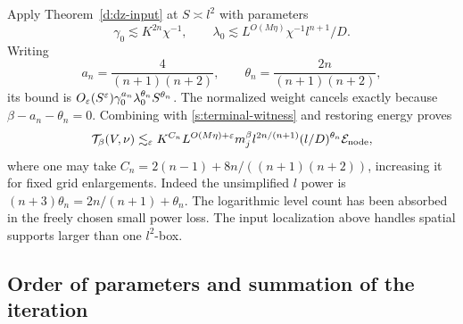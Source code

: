 Apply Theorem~\ref{d:dz-input} at $S\asymp l^2$ with parameters
\[
 \gamma_0\lesssim K^{2n}\chi^{-1},\qquad
 \lambda_0\lesssim L^{O(M\eta)}\chi^{-1}l^{n+1}/D.
\]
Writing
\[
 a_n=\frac4{(n+1)(n+2)},\qquad
 \theta_n=\frac{2n}{(n+1)(n+2)},
\]
its bound is $O_\varepsilon(S^\varepsilon)\gamma_0^{a_n}\lambda_0^{\theta_n}
S^{\theta_n}$.  The normalized weight cancels exactly because
$\beta-a_n-\theta_n=0$.  Combining with \eqref{s:terminal-witness}
and restoring energy proves
\begin{equation}\label{s:terminal-bound}
 \mathcal T_\beta(V,\nu)
 \lesssim_\varepsilon K^{C_n}L^{O(M\eta)+\varepsilon}
       m_j^\beta l^{2n/(n+1)}(l/D)^{\theta_n}\mathcal E_{\rm node},
\end{equation}
where one may take
$C_n=2(n-1)+8n/((n+1)(n+2))$, increasing it for fixed grid
enlargements.  Indeed the unsimplified $l$ power is
$(n+3)\theta_n=2n/(n+1)+\theta_n$.
The logarithmic level count has been absorbed in the freely chosen
small power loss.  The input localization above handles spatial
supports larger than one $l^2$-box.

\subsection{Order of parameters and summation of the iteration}

